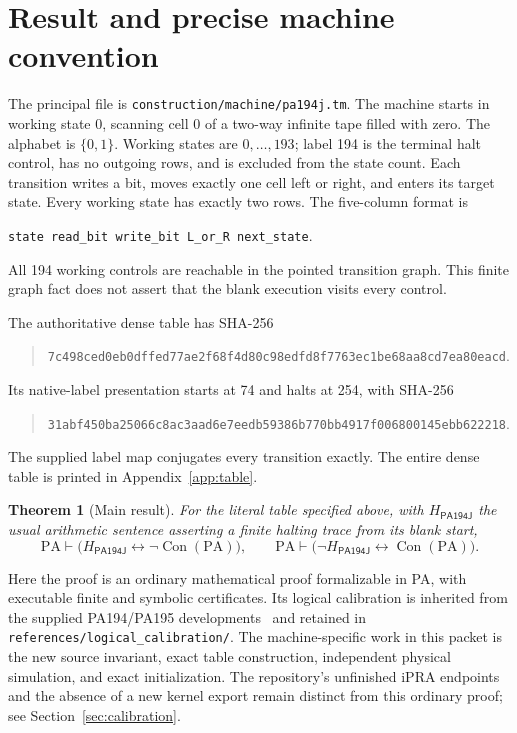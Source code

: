 \documentclass[11pt,letterpaper]{article}
\newcommand{\PA}{\mathrm{PA}}
\newcommand{\Con}{\operatorname{Con}}
\newcommand{\file}[1]{\texttt{\nolinkurl{#1}}}
\newcommand{\M}{\mathsf{PA194J}}
\newtheorem{theorem}{Theorem}[section]
\begin{document}
\section{Result and precise machine convention}

The principal file is \file{construction/machine/pa194j.tm}. The machine
starts in working state 0, scanning cell 0 of a two-way infinite tape
filled with zero. The alphabet is \(\{0,1\}\). Working states are
\(0,\ldots,193\); label 194 is the terminal halt control, has no outgoing
rows, and is excluded from the state count. Each transition writes a bit,
moves exactly one cell left or right, and enters its target state.
Every working state has exactly two rows. The five-column format is
\begin{center}
\file{state read_bit write_bit L_or_R next_state}.
\end{center}
All 194 working controls are reachable in the pointed transition graph.
This finite graph fact does not assert that the blank execution visits
every control.

The authoritative dense table has SHA-256
\begin{quote}\small
\nolinkurl{7c498ced0eb0dffed77ae2f68f4d80c98edfd8f7763ec1be68aa8cd7ea80eacd}.
\end{quote}
Its native-label presentation starts at 74 and halts at 254, with SHA-256
\begin{quote}\small
\nolinkurl{31abf450ba25066c8ac3aad6e7eedb59386b770bb4917f006800145ebb622218}.
\end{quote}
The supplied label map conjugates every transition exactly. The entire
dense table is printed in Appendix~\ref{app:table}.

\begin{theorem}[Main result]
For the literal table specified above, with \(H_\M\) the usual arithmetic
sentence asserting a finite halting trace from its blank start,
\[
 \PA\vdash \bigl(H_\M\leftrightarrow\neg\Con(\PA)\bigr),
 \qquad
 \PA\vdash \bigl(\neg H_\M\leftrightarrow\Con(\PA)\bigr).
\]
\end{theorem}

Here the proof is an ordinary mathematical proof formalizable in PA,
with executable finite and symbolic certificates. Its logical calibration
is inherited from the supplied PA194/PA195 developments~\cite{pa194,cached} and retained in
\file{references/logical_calibration/}. The machine-specific work in this
packet is the new source invariant, exact table construction, independent
physical simulation, and exact initialization. The repository's unfinished
iPRA endpoints and the absence of a new kernel export remain distinct
from this ordinary proof; see Section~\ref{sec:calibration}.
\end{document}
